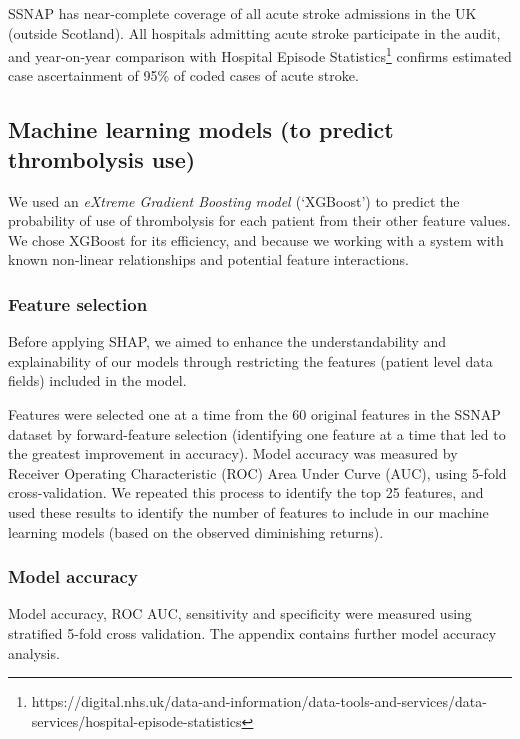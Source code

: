  SSNAP has near-complete coverage of all acute stroke admissions in the UK (outside Scotland). All hospitals admitting acute stroke participate in the audit, and year-on-year comparison with Hospital Episode Statistics\footnote{https://digital.nhs.uk/data-and-information/data-tools-and-services/data-services/hospital-episode-statistics} confirms estimated case ascertainment of 95\% of coded cases of acute stroke.


\subsection{Machine learning models (to predict thrombolysis use)}
We used an \emph{eXtreme Gradient Boosting model \cite{chen_xgboost_2016}} (`XGBoost') to predict the probability of use of thrombolysis for each patient from their other feature values. We chose XGBoost for its efficiency, and because we working with a system with known non-linear relationships and potential feature interactions.


\subsubsection{Feature selection}
Before applying SHAP, we aimed to enhance the understandability and explainability of our models through restricting the features (patient level data fields) included in the model. 

Features were selected one at a time from the 60 original features in the SSNAP dataset by forward-feature selection \cite{ferri_comparative_1994} (identifying one feature at a time that led to the greatest improvement in accuracy). Model accuracy was measured by Receiver Operating Characteristic (ROC) Area Under Curve (AUC), using 5-fold cross-validation. We repeated this process to identify the top 25 features, and used these results to identify the number of features to include in our machine learning models (based on the observed diminishing returns).


\subsubsection{Model accuracy}
Model accuracy, ROC AUC, sensitivity and specificity were measured using stratified 5-fold cross validation. The appendix contains further model accuracy analysis.

